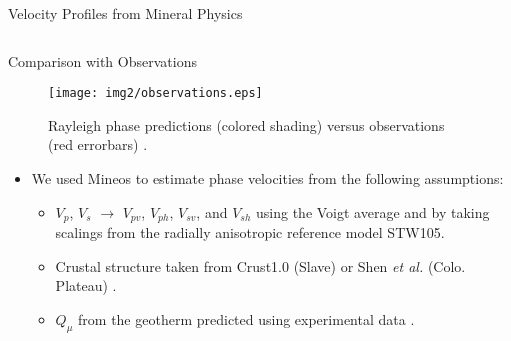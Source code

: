 \documentclass[final]{beamer}
\newlength{\onecolwid}
\newlength{\twocolwid}
\begin{document}
\begin{frame}[t]
\begin{columns}[t]
\begin{column}{\twocolwid}
\begin{columns}[t,totalwidth=\twocolwid]
\begin{column}{\onecolwid}
\begin{block}{Velocity Profiles from Mineral Physics}
\begin{itemize}
\end{itemize}

\end{block}


\end{column} %

\end{columns} %


\begin{columns}[t,totalwidth=\twocolwid] %

\begin{column}{\onecolwid} %


\begin{alertblock}{Comparison with Observations}

\begin{figure}
\texttt{[image: img2/observations.eps]}
\caption{Rayleigh phase predictions (colored shading) versus observations (red errorbars) \cite{Pasyanos2014, Babikoff2018}.}
\end{figure}

\begin{itemize}

\item We used Mineos to estimate phase velocities from the following assumptions:

\begin{itemize}

\item $V_{p}$, $V_{s}$ $\rightarrow$ $V_{pv}$, $V_{ph}$, $V_{sv}$, and $V_{sh}$ using the Voigt average and by taking scalings from the radially anisotropic reference model STW105.

\item Crustal structure taken from Crust1.0 (Slave) or Shen \emph{et al.} (Colo. Plateau) \cite{Pasyanos2014, Shen2013}.

\item $Q_\mu$ from the geotherm predicted using experimental data \cite{Faul2002}.


\end{itemize}
\end{itemize}
\end{alertblock}
\end{column}
\end{columns}
\end{column}
\end{columns}
\end{frame}
\end{document}
